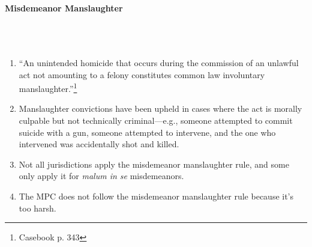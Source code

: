 \paragraph{Misdemeanor Manslaughter}
~\\\\
\begin{enumerate}
    \item ``An unintended homicide that occurs during the commission of an 
    unlawful act not amounting to a felony constitutes common law involuntary 
    manslaughter.''\footnote{Casebook p. 343}
    \item Manslaughter convictions have been upheld in cases where the act is 
    morally culpable but not technically criminal---e.g., someone attempted to 
    commit suicide with a gun, someone attempted to intervene, and the one who 
    intervened was accidentally shot and killed.
    \item Not all jurisdictions apply the misdemeanor manslaughter rule, and 
    some only apply it for \emph{malum in se} misdemeanors.
    \item The MPC does not follow the misdemeanor manslaughter rule because 
    it's too harsh.
\end{enumerate}
